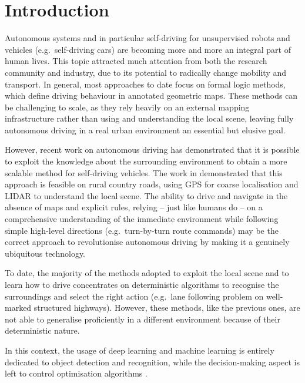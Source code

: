 \chapter{Introduction} \label{ch:ch1}

Autonomous systems and in particular self-driving for unsupervised robots and vehicles (e.g.\ self-driving cars) are becoming more and more an integral part of human lives.
This topic attracted much attention from both the research community and industry, due to its potential to radically change mobility and transport.
In general, most approaches to date focus on formal logic methods, which define driving behaviour in annotated geometric maps.
These methods can be challenging to scale, as they rely heavily on an external mapping infrastructure rather than using and understanding the local scene, leaving fully autonomous driving in a real urban environment an essential but elusive goal.

However, recent work on autonomous driving has demonstrated that it is possible to exploit the knowledge about the surrounding environment to obtain a more scalable method for self-driving vehicles.
The work in \cite{ort2018autonomous} demonstrated that this approach is feasible on rural country roads, using GPS for coarse localisation and LIDAR to understand the local scene.
The ability to drive and navigate in the absence of maps and explicit rules, relying – just like humans do – on a comprehensive understanding of the immediate environment while following simple high-level directions (e.g.\ turn-by-turn route commands) may be the correct approach to revolutionise autonomous driving by making it a genuinely ubiquitous technology.

To date, the majority of the methods adopted to exploit the local scene and to learn how to drive concentrates on deterministic algorithms to recognise the surroundings and select the right action (e.g.\ lane following problem on well-marked structured highways).
However, these methods, like the previous ones, are not able to generalise proficiently in a different environment because of their deterministic nature.

In this context, the usage of deep learning and machine learning is entirely dedicated to object detection and recognition, while the decision-making aspect is left to control optimisation algorithms \cite{huval2015empirical}.

